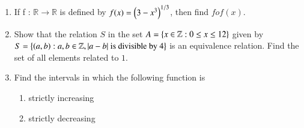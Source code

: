 \begin{enumerate}

\item If f : $\mathbb{R} \rightarrow \mathbb{R}$ is defined by $f(x) = \left(3 - x^3\right)^{1/3}$, then find $fof(x)$.

\item Show that the relation $S$ in the set $A = \left\{x \in \mathbb{Z} : 0 \leq x \leq 12\right\}$ given by $S = \left\{\left(a, b\right) : a, b \in \mathbb{Z}, |a - b| \text{ is divisible by 4}\right\}$ is an equivalence relation.  Find the set of all elements related to $1$.

\item Find the intervals in which the following function is
    \begin{enumerate}
    \item strictly increasing
    \item strictly decreasing
    \end{enumerate}

\end{enumerate}
